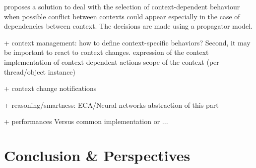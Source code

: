 \documentclass[a4paper]{article}
\begin{document}
\cite{bainomugisha_towards_2009} proposes a solution to deal with the selection of context-dependent behaviour when possible conflict between contexts could appear especially in the case of dependencies between context.  The decisions are made using a propagator model.




+ context management: how to define context-specific behaviors? Second, it may be important to react to context changes.
  expression of the context
  implementation of context dependent actions
  scope of the context (per thread/object instance)

+ context change notifications

+ reasoning/smartness: ECA/Neural networks
abstraction of this part


+ performances
  Versus common implementation or ...
  

\section{Conclusion \& Perspectives}

%
%



\end{document}
